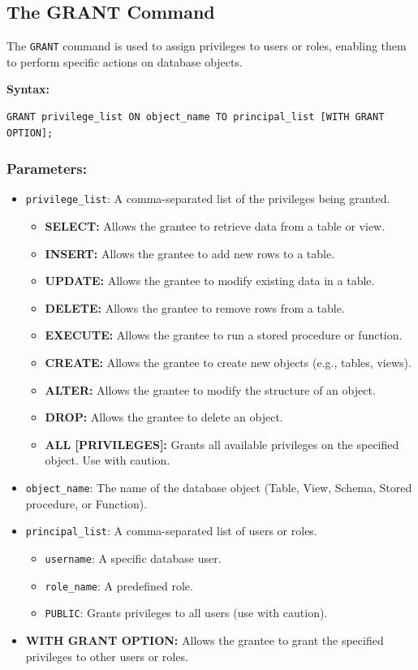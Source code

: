 \documentclass[12pt,a4paper]{article}
\begin{document}
\subsection{The GRANT Command}
The \texttt{GRANT} command is used to assign privileges to users or roles, enabling them to perform specific actions on database objects.

\textbf{Syntax:}
\begin{verbatim}
GRANT privilege_list ON object_name TO principal_list [WITH GRANT OPTION];
\end{verbatim}

\subsubsection*{Parameters:}
\begin{itemize}
    \item \texttt{privilege\_list}: A comma-separated list of the privileges being granted.
    \begin{itemize}
        \item \textbf{SELECT:} Allows the grantee to retrieve data from a table or view.
        \item \textbf{INSERT:} Allows the grantee to add new rows to a table.
        \item \textbf{UPDATE:} Allows the grantee to modify existing data in a table.
        \item \textbf{DELETE:} Allows the grantee to remove rows from a table.
        \item \textbf{EXECUTE:} Allows the grantee to run a stored procedure or function.
        \item \textbf{CREATE:} Allows the grantee to create new objects (e.g., tables, views).
        \item \textbf{ALTER:} Allows the grantee to modify the structure of an object.
        \item \textbf{DROP:} Allows the grantee to delete an object.
        \item \textbf{ALL [PRIVILEGES]:} Grants all available privileges on the specified object. Use with caution.
    \end{itemize}
    \item \texttt{object\_name}: The name of the database object (Table, View, Schema, Stored procedure, or Function).
    \item \texttt{principal\_list}: A comma-separated list of users or roles.
    \begin{itemize}
        \item \texttt{username}: A specific database user.
        \item \texttt{role\_name}: A predefined role.
        \item \texttt{PUBLIC}: Grants privileges to all users (use with caution).
    \end{itemize}
    \item \textbf{WITH GRANT OPTION:} Allows the grantee to grant the specified privileges to other users or roles.
\end{itemize}
\end{document}
